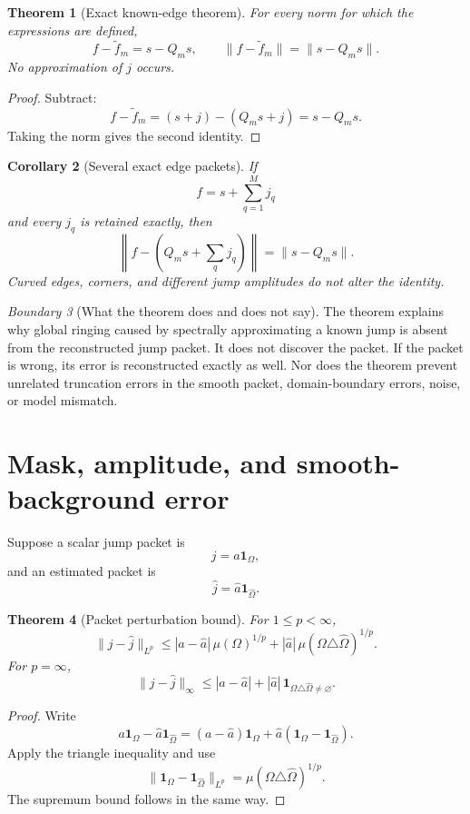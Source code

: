 \documentclass[11pt]{article}
\newtheorem{theorem}{Theorem}[section]
\newtheorem{corollary}[theorem]{Corollary}
\theoremstyle{definition}
\theoremstyle{remark}
\newtheorem{boundary}[theorem]{Boundary}
\begin{document}
\begin{theorem}[Exact known-edge theorem]
For every norm for which the expressions are defined,
\[
\boxed{
f-\widetilde f_m=s-Q_ms,
\qquad
\|f-\widetilde f_m\|=\|s-Q_ms\|.
}
\]
No approximation of $j$ occurs.
\end{theorem}

\begin{proof}
Subtract:
\[
f-\widetilde f_m=(s+j)-(Q_ms+j)=s-Q_ms.
\]
Taking the norm gives the second identity.
\end{proof}

\begin{corollary}[Several exact edge packets]
If
\[
f=s+\sum_{q=1}^{M}j_q
\]
and every $j_q$ is retained exactly, then
\[
\left\|f-\left(Q_ms+\sum_qj_q\right)\right\|
=\|s-Q_ms\|.
\]
Curved edges, corners, and different jump amplitudes do not alter the identity.
\end{corollary}

\begin{boundary}[What the theorem does and does not say]
The theorem explains why global ringing caused by spectrally approximating a known jump is absent from the reconstructed jump packet. It does not discover the packet. If the packet is wrong, its error is reconstructed exactly as well. Nor does the theorem prevent unrelated truncation errors in the smooth packet, domain-boundary errors, noise, or model mismatch.
\end{boundary}

\section{Mask, amplitude, and smooth-background error}

Suppose a scalar jump packet is
\[
j=a\mathbf 1_{\Omega},
\]
and an estimated packet is
\[
\widehat j=\widehat a\mathbf 1_{\widehat\Omega}.
\]

\begin{theorem}[Packet perturbation bound]
For $1\le p<\infty$,
\[
\boxed{
\|j-\widehat j\|_{L^p}
\le
|a-\widehat a|\,\mu(\Omega)^{1/p}
+
|\widehat a|\,\mu(\Omega\triangle\widehat\Omega)^{1/p}.
}
\]
For $p=\infty$,
\[
\|j-\widehat j\|_{\infty}
\le |a-\widehat a|+|\widehat a|\,
\mathbf 1_{\Omega\triangle\widehat\Omega\ne\varnothing}.
\]
\end{theorem}

\begin{proof}
Write
\[
a\mathbf 1_{\Omega}-\widehat a\mathbf 1_{\widehat\Omega}
=(a-\widehat a)\mathbf 1_{\Omega}
+\widehat a(\mathbf 1_{\Omega}-\mathbf 1_{\widehat\Omega}).
\]
Apply the triangle inequality and use
\[
\|\mathbf 1_{\Omega}-\mathbf 1_{\widehat\Omega}\|_{L^p}
=\mu(\Omega\triangle\widehat\Omega)^{1/p}.
\]
The supremum bound follows in the same way.
\end{proof}
\end{document}
